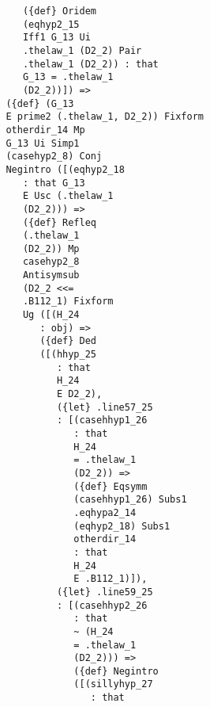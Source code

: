 \documentclass[12pt]{article}
\begin{document}
\begin{verbatim}
                               ({def} Oridem 
                               (eqhyp2_15 
                               Iff1 G_13 Ui 
                               .thelaw_1 (D2_2) Pair 
                               .thelaw_1 (D2_2)) : that 
                               G_13 = .thelaw_1 
                               (D2_2))]) => 
                            ({def} (G_13 
                            E prime2 (.thelaw_1, D2_2)) Fixform 
                            otherdir_14 Mp 
                            G_13 Ui Simp1 
                            (casehyp2_8) Conj 
                            Negintro ([(eqhyp2_18 
                               : that G_13 
                               E Usc (.thelaw_1 
                               (D2_2))) => 
                               ({def} Refleq 
                               (.thelaw_1 
                               (D2_2)) Mp 
                               casehyp2_8 
                               Antisymsub 
                               (D2_2 <<= 
                               .B112_1) Fixform 
                               Ug ([(H_24 
                                  : obj) => 
                                  ({def} Ded 
                                  ([(hhyp_25 
                                     : that 
                                     H_24 
                                     E D2_2), 
                                     ({let} .line57_25 
                                     : [(casehhyp1_26 
                                        : that 
                                        H_24 
                                        = .thelaw_1 
                                        (D2_2)) => 
                                        ({def} Eqsymm 
                                        (casehhyp1_26) Subs1 
                                        .eqhypa2_14 
                                        (eqhyp2_18) Subs1 
                                        otherdir_14 
                                        : that 
                                        H_24 
                                        E .B112_1)]), 
                                     ({let} .line59_25 
                                     : [(casehhyp2_26 
                                        : that 
                                        ~ (H_24 
                                        = .thelaw_1 
                                        (D2_2))) => 
                                        ({def} Negintro 
                                        ([(sillyhyp_27 
                                           : that 

\end{verbatim}
\end{document}
